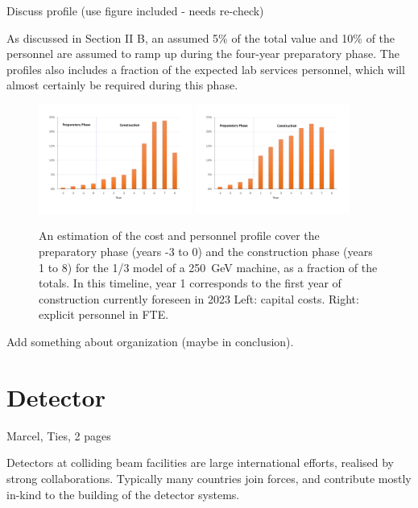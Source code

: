 \documentclass[%
 reprint,
 amsmath,amssymb,
 aps,
]{revtex4-1}
\begin{document}
Discuss profile (use figure included - needs re-check)

As discussed in Section II B, an assumed 5\% of the total value and 10\% of the personnel are assumed
to ramp up during the four-year preparatory phase. The profiles also includes a fraction
of the expected lab services personnel, which will almost certainly be required during this
phase. 

\begin{figure}[htbp]
\includegraphics[width=0.45\textwidth]{figures/profile-250GeV-MEUR-norm.pdf}
\includegraphics[width=0.45\textwidth]{figures/profile-250GeV-FTE-norm.pdf}
\caption{\label{fig:costprofile:costprofile} An estimation of the cost and personnel profile cover the preparatory phase (years -3 to 0) 
and the construction phase (years 1 to 8) for the 1/3 model of a 250~GeV machine, as a fraction of the
totals. In this timeline, 
year 1 corresponds to the first year of construction currently foreseen in 2023 
Left: capital costs. Right: explicit personnel in FTE.
}
\end{figure}

Add something about organization (maybe in conclusion).

\section{\label{sec:det}Detector}
Marcel, Ties, 2 pages

Detectors at colliding beam facilities are large international efforts, realised by strong collaborations. Typically many countries join forces, and contribute mostly in-kind to the building of the detector systems. 
\end{document}
